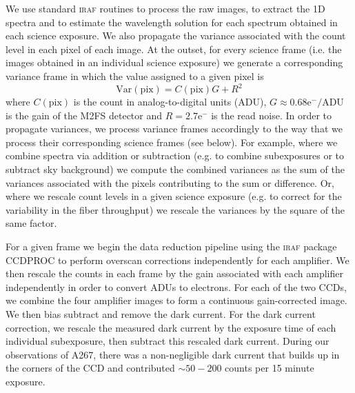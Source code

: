 \documentclass[twocolumn]{aastex6}
\begin{document}
We use standard \textsc{iraf} routines to process the raw images, to extract the 1D spectra and to estimate the wavelength solution for each spectrum obtained in each science exposure.
We also propagate the variance associated with the count level in each pixel of each image.
At the outset, for every science frame (i.e. the images obtained in an individual science exposure) we generate a corresponding variance frame in which the value assigned to a given pixel is 
\begin{equation}
\label{pixel variance}
\mathrm{Var(pix)}=C(\mathrm{pix})G+R^2
\end{equation}
where $C(\mathrm{pix})$ is the count in analog-to-digital units (ADU), $G\approx0.68\mathrm{e}^-/\mathrm{ADU}$ is the gain of the M2FS detector and $R=2.7\mathrm{e}^-$ is the read noise.
In order to propagate variances, we process variance frames accordingly to the way that we process their corresponding science frames (see below).
For example, where we combine spectra via addition or subtraction (e.g. to combine subexposures or to subtract sky background) we compute the combined variances as the sum of the variances associated with the pixels contributing to the sum or difference.
Or, where we rescale count levels in a given science exposure (e.g. to correct for the variability in the fiber throughput) we rescale the variances by the square of the same factor.

For a given frame we begin the data reduction pipeline using the \textsc{iraf} package CCDPROC to perform overscan corrections independently for each amplifier.
We then rescale the counts in each frame by the gain associated with each amplifier independently in order to convert ADUs to electrons.
For each of the two CCDs, we combine the four amplifier images to form a continuous gain-corrected image.
We then bias subtract and remove the dark current.
For the dark current correction, we rescale the measured dark current by the exposure time of each individual subexposure, then subtract this rescaled dark current.
During our observations of A267, there was a non-negligible dark current that builds up in the corners of the CCD and contributed $\sim50-200$ counts per 15 minute exposure.
\end{document}
